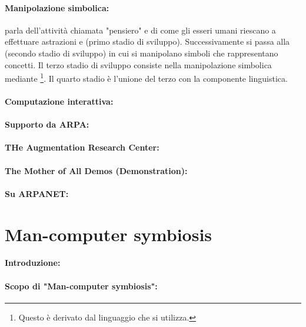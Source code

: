 \paragraph{Manipolazione simbolica:} parla dell'attività chiamata "pensiero" e di come gli esseri
umani riescano a effettuare astrazioni e  (primo stadio di sviluppo).
Successivamente si passa alla  (secondo stadio di sviluppo) in cui si manipolano
simboli che rappresentano concetti. Il terzo stadio di sviluppo consiste nella manipolazione simbolica mediante \footnote{Questo 
è derivato dal linguaggio che si utilizza.
}. Il quarto stadio è l'unione del terzo con la componente linguistica.

\paragraph{Computazione interattiva:}

\paragraph{Supporto da ARPA:}

\paragraph{THe Augmentation Research Center:}

\paragraph{The Mother of All Demos (Demonstration):}

\paragraph{Su ARPANET:}

\section{Man-computer symbiosis}

\paragraph{Introduzione:}

\paragraph{Scopo di "Man-computer symbiosis":}

